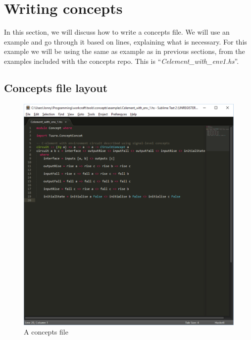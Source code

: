 \documentclass{proc}
\begin{document}
\section{Writing concepts \label{sec:concepts_layout}}

In this section, we will discuss how to write a concepts file. We will use an example and go through it based on lines, explaining what is necessary. For this example we will be using the same 
as example as in previous sections, from the examples included with the concepts repo. This is ``\emph{Celement\_with\_env1.hs}''.

\subsection{Concepts file layout}

\begin{figure}[H]
\begin{centering}
\includegraphics[scale=0.6]{images/concepts_file_screenshot}
\par\end{centering}

\begin{centering}
\protect\caption{\label{fig:concepts_file}A concepts file}

\par\end{centering}

\end{figure}
\end{document}
